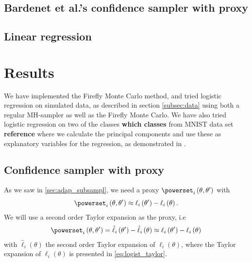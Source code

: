 \subsection{Bardenet et al.'s confidence sampler with proxy}





\subsection{Linear regression}

\section*{Results}
We have implemented the Firefly Monte Carlo method, and tried logistic regression on simulated data, as described in section \ref{subsec:data} using both a regular MH-sampler as well as the Firefly Monte Carlo. 
We have also tried logistic regression on two of the classes \textbf{which classes} from MNIST data set \textbf{reference} where we calculate the principal components and use these as explanatory variables for the regression, as demonstrated in \cite{Maclaurin:1}. 

\subsection{Confidence sampler with proxy}
As we saw in \ref{sec:adap_subsampl}, we need a proxy $\powerset_i\left(\theta, \theta'\right)$ with $$\powerset_i\left(\theta, \theta'\right) \approx \ell_i\left(\theta'\right) - \ell_i\left(\theta\right). $$   
We will use a second order Taylor expansion as the proxy, i.e 
\begin{equation}
    \powerset_i\left(\theta, \theta'\right) = \hat{\ell}_i\left(\theta'\right) - \hat{\ell}_i\left(\theta\right) \approx \ell_i\left(\theta'\right) - \ell_i\left(\theta\right)
\end{equation}
with $\hat{\ell}_i\left(\theta\right)$ the second order Taylor expansion of $\ell_i\left(\theta\right)$, where the Taylor expansion of $\ell_i\left(\theta\right)$ is presented in \eqref{eq:logist_taylor}. 
